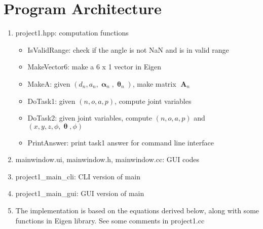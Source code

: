 \documentclass[12pt]{article}
\DeclareMathOperator{\A}{\mathbf{A}}
\DeclareMathOperator{\al}{\mathbf{\alpha}}
\DeclareMathOperator{\Th}{\mathbf{\theta}}
\begin{document}
\section{Program Architecture}
\begin{enumerate}
  \item project1.hpp: computation functions
    \begin{itemize}
      \item IsValidRange: check if the angle is not NaN and is in valid range
      \item MakeVector6: make a 6 x 1 vector in Eigen
      \item MakeA: given $(d_n, a_n, \al_n, \Th_n)$, make matrix $\A_n$
      \item DoTask1: given $(n, o, a, p)$, compute joint variables
      \item DoTask2: given joint variables, compute $(n, o, a, p)$ and $(x, y, z, \phi, \Th, \phi)$
      \item PrintAnswer: print task1 answer for command line interface
    \end{itemize}
  \item mainwindow.ui, mainwindow.h, mainwindow.cc: GUI codes\\
  \item project1\_main\_cli: CLI version of main\\
  \item project1\_main\_gui: GUI version of main
  \item The implementation is based on the equations derived below, along with some functions in Eigen library.
        See some comments in project1.cc
\end{enumerate}
\end{document}
